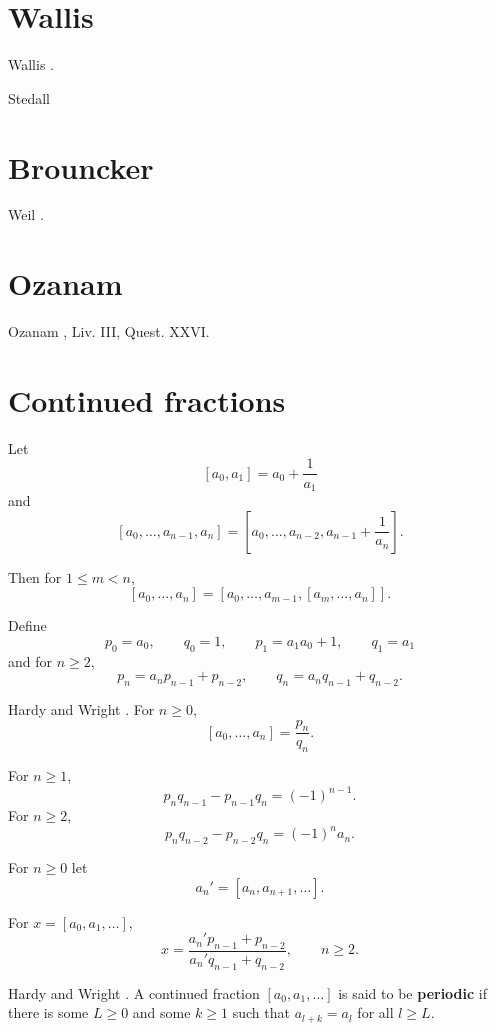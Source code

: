 \documentclass{article}
\theoremstyle{definition}
\theoremstyle{definition}
\begin{document}
\section{Wallis}
Wallis \cite[p.~546]{wallisII}.

Stedall \cite{stedall}



\section{Brouncker}
Weil \cite[pp.~92--99]{weil}.






\section{Ozanam}
Ozanam \cite[pp.~503--516]{ozanam}, Liv. III, Quest. XXVI.



\section{Continued fractions}
Let
\[
[a_0,a_1] = a_0 + \frac{1}{a_1}
\]
and
\[
[a_0,\ldots,a_{n-1},a_n] = \left[a_0,\ldots,a_{n-2},a_{n-1}+\frac{1}{a_n}\right].
\]

Then for $1 \leq m < n$,
\[
[a_0,\ldots,a_n] = [a_0,\ldots,a_{m-1},[a_m,\ldots,a_n]].
\]

Define
\[
p_0=a_0,\qquad q_0=1,
\qquad p_1=a_1a_0+1,\qquad q_1=a_1
\]
and for $n \geq 2$,
\[
p_n=a_np_{n-1}+p_{n-2},\qquad q_n=a_nq_{n-1}+q_{n-2}.
\]

Hardy and Wright \cite[p.~130, Theorem 149]{HW}. For $n \geq 0$,
\[
[a_0,\ldots,a_n] = \frac{p_n}{q_n}.
\]

For $n \geq 1$,
\[
p_n q_{n-1} - p_{n-1}q_n = (-1)^{n-1}.
\]
For $n \geq 2$,
\[
p_nq_{n-2} - p_{n-2}q_n = (-1)^n a_n.
\]

For $n \geq 0$ let
\[
a_n' = [a_n,a_{n+1},\ldots].
\]

For $x = [a_0,a_1,\ldots]$,
\[
x = \frac{a_n'p_{n-1}+p_{n-2}}{a_n'q_{n-1}+q_{n-2}},\qquad n \geq 2.
\]

Hardy and Wright \cite[p.~144, Theorem 176]{HW}.
A continued fraction $[a_0,a_1,\ldots]$ is said to be \textbf{periodic} if there is some
$L \geq 0$ and some $k \geq 1$ such that 
$a_{l+k}=a_l$ for all $l \geq L$.
\end{document}
